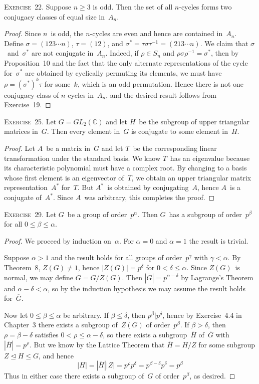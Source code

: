 \documentclass[letterpaper]{article}
\newcommand{\exercise}[1]{\goodbreak\noindent\textsc{Exercise~{#1}.}}
\newcommand{\C}{\mathbb{C}}
\newcommand{\subgroup}{\le}
\newcommand{\normal}{\trianglelefteq}
\newcommand{\res}[1]{\overline{#1}}
\newcommand{\ord}[1]{|{#1}|}
\begin{document}
\bigskip
\exercise{22}
Suppose $n\ge3$ is odd. Then the set of all $n$-cycles forms two conjugacy classes of equal size in~$A_n$.
\begin{proof}
Since $n$~is odd, the $n$-cycles are even and hence are contained in~$A_n$. Define $\sigma=(123\cdots n)$, $\tau=(12)$, and $\sigma^*=\tau\sigma\tau^{-1}=(213\cdots n)$. We claim that $\sigma$~and~$\sigma^*$ are not conjugate in~$A_n$. Indeed, if $\rho\in S_n$ and $\rho\sigma\rho^{-1}=\sigma^*$, then by Proposition~10 and the fact that the only alternate representations of the cycle for~$\sigma^*$ are obtained by cyclically permuting its elements, we must have $\rho=(\sigma^*)^k\tau$ for some~$k$, which is an odd permutation. Hence there is not one conjugacy class of $n$-cycles in~$A_n$, and the desired result follows from Exercise~19.
\end{proof}

\exercise{25}
Let $G=GL_2(\C)$ and let $H$~be the subgroup of upper triangular matrices in~$G$. Then every element in~$G$ is conjugate to some element in~$H$.
\begin{proof}
Let $A$~be a matrix in~$G$ and let $T$~be the corresponding linear transformation under the standard basis. We know $T$~has an eigenvalue because its characteristic polynomial must have a complex root. By changing to a basis whose first element is an eigenvector of~$T$, we obtain an upper triangular matrix representation~$A^*$ for~$T$. But $A^*$~is obtained by conjugating~$A$, hence $A$~is a conjugate of~$A^*$. Since $A$~was arbitrary, this completes the proof.
\end{proof}

\exercise{29}
Let $G$~be a group of order~$p^{\alpha}$. Then $G$~has a subgroup of order~$p^{\beta}$ for all $0\le\beta\le\alpha$.
\begin{proof}
We proceed by induction on~$\alpha$. For $\alpha=0$ and $\alpha=1$ the result is trivial.

Suppose $\alpha>1$ and the result holds for all groups of order~$p^{\gamma}$ with $\gamma<\alpha$. By Theorem~8, $Z(G)\ne1$, hence $\ord{Z(G)}=p^{\delta}$ for $0<\delta\le\alpha$. Since $Z(G)$~is normal, we may define $\res{G}=G/Z(G)$. Then $\ord{\res{G}}=p^{\alpha-\delta}$ by Lagrange's Theorem and $\alpha-\delta<\alpha$, so by the induction hypothesis we may assume the result holds for~$\res{G}$.

Now let $0\le\beta\le\alpha$ be arbitrary. If $\beta\le\delta$, then $p^{\beta}|p^{\delta}$, hence by Exercise~4.4 in Chapter~3 there exists a subgroup of~$Z(G)$ of order~$p^{\beta}$. If $\beta>\delta$, then $\rho=\beta-\delta$ satisfies $0<\rho\le\alpha-\delta$, so there exists a subgroup~$\res{H}$ of~$\res{G}$ with $\ord{\res{H}}=p^{\rho}$. But we know by the Lattice Theorem that $\res{H}=H/Z$ for some subgroup $Z\normal H\subgroup G$, and hence
$$\ord{H}=\ord{\res{H}}\ord{Z}=p^{\rho}p^{\delta}=p^{\beta-\delta}p^{\delta}=p^{\beta}$$
Thus in either case there exists a subgroup of~$G$ of order~$p^{\beta}$, as desired.
\end{proof}
\end{document}

